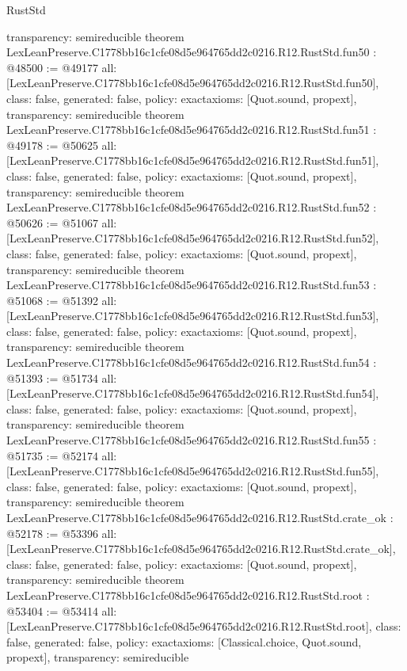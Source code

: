 \begin{lexlean}{RustStd}
\begin{coremodule}
{  transparency: semireducible
}
theorem LexLeanPreserve.C1778bb16c1cfe08d5e964765dd2c0216.R12.RustStd.fun50 : @48500 := @49177 {
  all: [LexLeanPreserve.C1778bb16c1cfe08d5e964765dd2c0216.R12.RustStd.fun50],
  class: false,
  generated: false,
  policy: exact{axioms: [Quot.sound, propext]},
  transparency: semireducible
}
theorem LexLeanPreserve.C1778bb16c1cfe08d5e964765dd2c0216.R12.RustStd.fun51 : @49178 := @50625 {
  all: [LexLeanPreserve.C1778bb16c1cfe08d5e964765dd2c0216.R12.RustStd.fun51],
  class: false,
  generated: false,
  policy: exact{axioms: [Quot.sound, propext]},
  transparency: semireducible
}
theorem LexLeanPreserve.C1778bb16c1cfe08d5e964765dd2c0216.R12.RustStd.fun52 : @50626 := @51067 {
  all: [LexLeanPreserve.C1778bb16c1cfe08d5e964765dd2c0216.R12.RustStd.fun52],
  class: false,
  generated: false,
  policy: exact{axioms: [Quot.sound, propext]},
  transparency: semireducible
}
theorem LexLeanPreserve.C1778bb16c1cfe08d5e964765dd2c0216.R12.RustStd.fun53 : @51068 := @51392 {
  all: [LexLeanPreserve.C1778bb16c1cfe08d5e964765dd2c0216.R12.RustStd.fun53],
  class: false,
  generated: false,
  policy: exact{axioms: [Quot.sound, propext]},
  transparency: semireducible
}
theorem LexLeanPreserve.C1778bb16c1cfe08d5e964765dd2c0216.R12.RustStd.fun54 : @51393 := @51734 {
  all: [LexLeanPreserve.C1778bb16c1cfe08d5e964765dd2c0216.R12.RustStd.fun54],
  class: false,
  generated: false,
  policy: exact{axioms: [Quot.sound, propext]},
  transparency: semireducible
}
theorem LexLeanPreserve.C1778bb16c1cfe08d5e964765dd2c0216.R12.RustStd.fun55 : @51735 := @52174 {
  all: [LexLeanPreserve.C1778bb16c1cfe08d5e964765dd2c0216.R12.RustStd.fun55],
  class: false,
  generated: false,
  policy: exact{axioms: [Quot.sound, propext]},
  transparency: semireducible
}
theorem LexLeanPreserve.C1778bb16c1cfe08d5e964765dd2c0216.R12.RustStd.crate_ok : @52178 := @53396 {
  all: [LexLeanPreserve.C1778bb16c1cfe08d5e964765dd2c0216.R12.RustStd.crate_ok],
  class: false,
  generated: false,
  policy: exact{axioms: [Quot.sound, propext]},
  transparency: semireducible
}
theorem LexLeanPreserve.C1778bb16c1cfe08d5e964765dd2c0216.R12.RustStd.root : @53404 := @53414 {
  all: [LexLeanPreserve.C1778bb16c1cfe08d5e964765dd2c0216.R12.RustStd.root],
  class: false,
  generated: false,
  policy: exact{axioms: [Classical.choice, Quot.sound, propext]},
  transparency: semireducible
}


\end{coremodule}
\end{lexlean}

